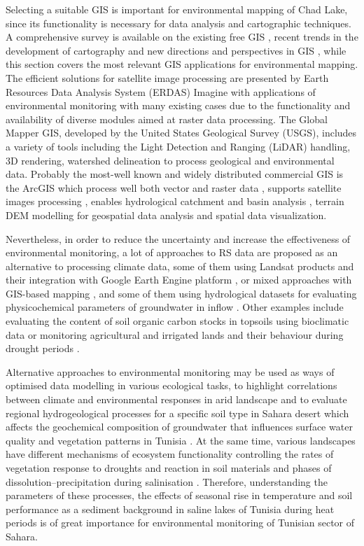 \documentclass[land,article,submit,pdftex,moreauthors]{Definitions/mdpi}
\begin{document}
Selecting a suitable GIS is important for environmental mapping of Chad Lake, since its functionality is necessary for data analysis and cartographic techniques. A comprehensive survey is available on the existing free GIS \cite{LEIDIG201549,CHEN2010253}, recent trends in the development of cartography \cite{WangWu} and new directions and perspectives in GIS \cite{Lietal2022}, while this section covers the most relevant GIS applications for environmental mapping. The efficient solutions for satellite image processing are presented by Earth Resources Data Analysis System (ERDAS) Imagine with applications of environmental monitoring \cite{FALAKI2020363} with many existing cases due to the functionality and availability of diverse modules aimed at raster data processing. The Global Mapper GIS, developed by the United States Geological Survey (USGS), includes a variety of tools including the Light Detection and Ranging (LiDAR) handling, 3D rendering, watershed delineation to process geological and environmental data. Probably the most-well known and widely distributed commercial GIS is the ArcGIS which process well both vector and raster data \cite{AlDjazouli}, supports satellite images processing \cite{SESNIE20082145}, enables hydrological catchment and basin analysis \cite{Nkiaka}, terrain DEM modelling for geospatial data analysis \cite{Kay} and spatial data visualization. 

Nevertheless, in order to reduce the uncertainty and increase the effectiveness of environmental monitoring, a lot of approaches to RS data are proposed as an alternative to processing climate data, some of them using Landsat products \cite{Lemenkova202315} and their integration with Google Earth Engine platform \cite{rs15133257}, or mixed approaches with GIS-based mapping \cite{SAIDI20091683,ANANE201236,Lemenkova202217}, and some of them using hydrological datasets for evaluating physicochemical parameters of groundwater in inflow \cite{BENBRAHIM2021104224}. Other examples include evaluating the content of soil organic carbon stocks in topsoils using bioclimatic data \cite{BAHRI2022e00561} or monitoring agricultural and irrigated lands and their behaviour during drought periods \cite{MOHAMED2023e01766}. 

Alternative approaches to environmental monitoring may be used as ways of optimised data modelling in various ecological tasks, to highlight correlations between climate and environmental responses in arid landscape \cite{BESSER2021104134} and to evaluate regional hydrogeological processes for a specific soil type in Sahara desert which affects the geochemical composition of groundwater that influences surface water quality and vegetation patterns in Tunisia \cite{HAMDI2021102974,RAFAATRIGUI2021104121}. At the same time, various landscapes have different mechanisms of ecosystem functionality controlling the rates of vegetation response to droughts and reaction in soil materials and phases of dissolution–precipitation during salinisation \cite{NAVARROTORRE2023105397}. Therefore, understanding the parameters of these processes, the effects of seasonal rise in temperature and soil performance as a sediment background in saline lakes of Tunisia during heat periods is of great importance for environmental monitoring of Tunisian sector of Sahara.
\end{document}
